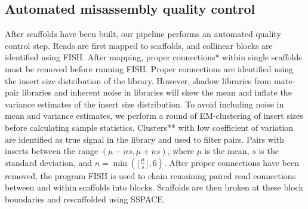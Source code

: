 \documentclass{bioinfo}
\begin{document}
\subsection{Automated misassembly quality control}

After scaffolds have been built, our pipeline performs an automated quality control step.
Reads are first mapped to scaffolds, and collinear blocks are identified using FISH. After mapping,
proper connections* within single scaffolds must be removed before running FISH. Proper connections
are identified using the insert size distribution of the library. However, shadow libraries from 
mate-pair libraries and inherent noise in libraries will skew the mean and inflate the variance 
estimates of the insert size distribution. To avoid including noise in mean and variance estimates, 
we perform a round of EM-clustering of insert sizes before calculating sample statistics. Clusters**
with low coefficient of variation are identified as true signal in the library and used to filter 
pairs. Pairs with inserts between the range $(\mu-ns,\mu+ns)$, where $\mu$ is the mean, $s$ is the standard
deviation, and $n = \min(\lfloor\frac{\mu}{s}\rfloor, 6)$. 
After proper connections have been removed, the program FISH is used to chain remaining paired read 
connections between and within scaffolds into blocks. Scaffolds are then broken at these block boundaries
and rescaffolded using SSPACE.
\end{document}
